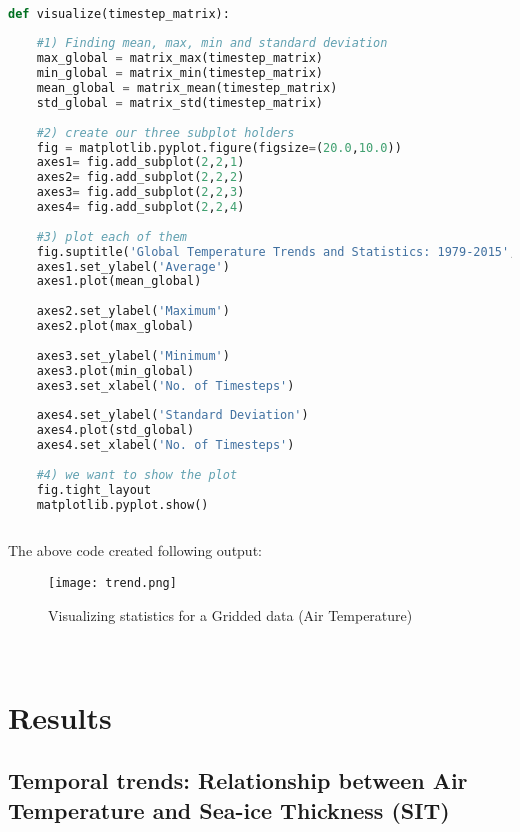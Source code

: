 \documentclass{article} %
\begin{document}
\begin{lstlisting}[language=Python, caption= Defining functions for creating Visualizations]

def visualize(timestep_matrix):
    
    #1) Finding mean, max, min and standard deviation
    max_global = matrix_max(timestep_matrix)
    min_global = matrix_min(timestep_matrix)
    mean_global = matrix_mean(timestep_matrix)
    std_global = matrix_std(timestep_matrix)
    
    #2) create our three subplot holders
    fig = matplotlib.pyplot.figure(figsize=(20.0,10.0))
    axes1= fig.add_subplot(2,2,1)
    axes2= fig.add_subplot(2,2,2)
    axes3= fig.add_subplot(2,2,3)
    axes4= fig.add_subplot(2,2,4)
    
    #3) plot each of them 
    fig.suptitle('Global Temperature Trends and Statistics: 1979-2015', fontsize=25)
    axes1.set_ylabel('Average')
    axes1.plot(mean_global)
    
    axes2.set_ylabel('Maximum')
    axes2.plot(max_global)
    
    axes3.set_ylabel('Minimum')
    axes3.plot(min_global)
    axes3.set_xlabel('No. of Timesteps')
    
    axes4.set_ylabel('Standard Deviation')
    axes4.plot(std_global)
    axes4.set_xlabel('No. of Timesteps')
    
    #4) we want to show the plot
    fig.tight_layout
    matplotlib.pyplot.show()
    

\end{lstlisting}
The above code created following output: 

\begin{figure}[h]
    \centering
    \texttt{[image: trend.png]}%
    \caption{Visualizing statistics for a Gridded data (Air Temperature)}
    \label{fig:trend} %
\end{figure}\\


\section{Results}

\subsection{Temporal trends: Relationship between Air Temperature and Sea-ice Thickness (SIT)}
\end{document}
